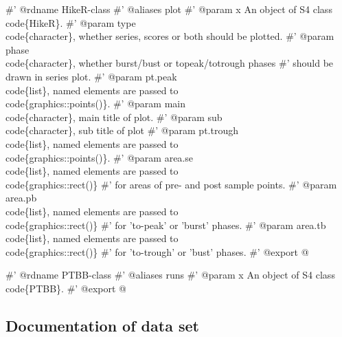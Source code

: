 \documentclass[a4paper]{article}
\begin{document}
\nwenddocs{}\endmoddef
#' @rdname HikeR-class
#' @aliases plot
#' @param x An object of S4 class \\code\{HikeR\}.
#' @param type \\code\{character\}, whether series, scores or both should be plotted.
#' @param phase \\code\{character\}, whether burst/bust or topeak/totrough phases
#' should be drawn in series plot.
#' @param pt.peak \\code\{list\}, named elements are passed to \\code\{graphics::points()\}.
#' @param main \\code\{character\}, main title of plot.
#' @param sub \\code\{character\}, sub title of plot
#' @param pt.trough \\code\{list\}, named elements are passed to \\code\{graphics::points()\}.
#' @param area.se \\code\{list\}, named elements are passed to \\code\{graphics::rect()\}
#' for areas of pre- and post sample points.
#' @param area.pb \\code\{list\}, named elements are passed to \\code\{graphics::rect()\}
#' for 'to-peak' or 'burst' phases.
#' @param area.tb \\code\{list\}, named elements are passed to \\code\{graphics::rect()\}
#' for 'to-trough' or 'bust' phases.
#' @export
\nwendcode{}@

\nwenddocs{}\endmoddef
#' @rdname PTBB-class
#' @aliases runs
#' @param x An object of S4 class \\code\{PTBB\}.
#' @export
\nwendcode{}@

\subsection{Documentation of data set}
\end{document}
